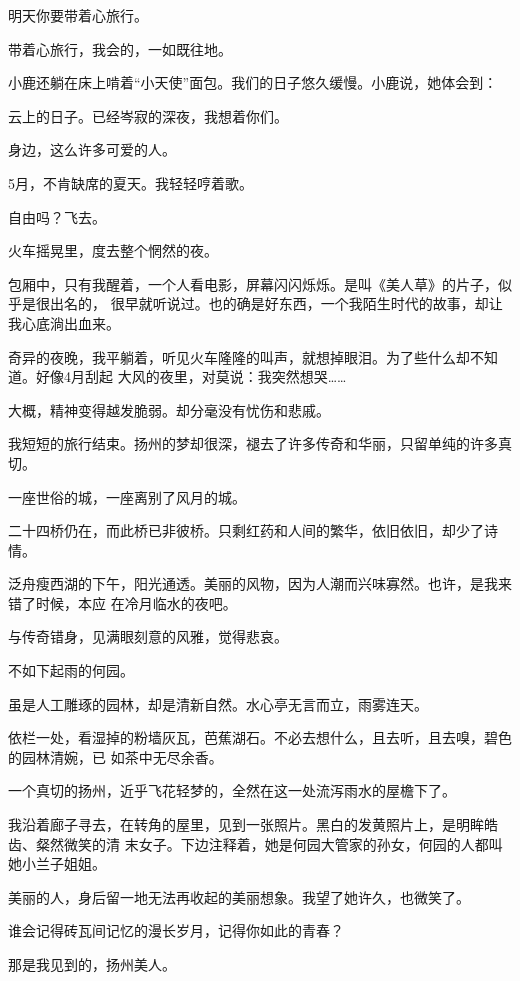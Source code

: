 		明天你要带着心旅行。

		带着心旅行，我会的，一如既往地。

		小鹿还躺在床上啃着“小天使”面包。我们的日子悠久缓慢。小鹿说，她体会到：

		云上的日子。已经岑寂的深夜，我想着你们。

		身边，这么许多可爱的人。

		5月，不肯缺席的夏天。我轻轻哼着歌。

		自由吗？飞去。

	\endwriting



		火车摇晃里，度去整个惘然的夜。

		包厢中，只有我醒着，一个人看电影，屏幕闪闪烁烁。是叫《美人草》的片子，似乎是很出名的，
	很早就听说过。也的确是好东西，一个我陌生时代的故事，却让我心底淌出血来。

		奇异的夜晚，我平躺着，听见火车隆隆的叫声，就想掉眼泪。为了些什么却不知道。好像4月刮起
	大风的夜里，对莫说：我突然想哭……

		大概，精神变得越发脆弱。却分毫没有忧伤和悲戚。

		我短短的旅行结束。扬州的梦却很深，褪去了许多传奇和华丽，只留单纯的许多真切。

		一座世俗的城，一座离别了风月的城。

		二十四桥仍在，而此桥已非彼桥。只剩红药和人间的繁华，依旧依旧，却少了诗情。

		泛舟瘦西湖的下午，阳光通透。美丽的风物，因为人潮而兴味寡然。也许，是我来错了时候，本应
	在冷月临水的夜吧。

		与传奇错身，见满眼刻意的风雅，觉得悲哀。

		不如下起雨的何园。

		虽是人工雕琢的园林，却是清新自然。水心亭无言而立，雨雾连天。

		依栏一处，看湿掉的粉墙灰瓦，芭蕉湖石。不必去想什么，且去听，且去嗅，碧色的园林清婉，已
	如茶中无尽余香。

		一个真切的扬州，近乎飞花轻梦的，全然在这一处流泻雨水的屋檐下了。

		我沿着廊子寻去，在转角的屋里，见到一张照片。黑白的发黄照片上，是明眸皓齿、粲然微笑的清
	末女子。下边注释着，她是何园大管家的孙女，何园的人都叫她小兰子姐姐。

		美丽的人，身后留一地无法再收起的美丽想象。我望了她许久，也微笑了。

		谁会记得砖瓦间记忆的漫长岁月，记得你如此的青春？

		那是我见到的，扬州美人。

